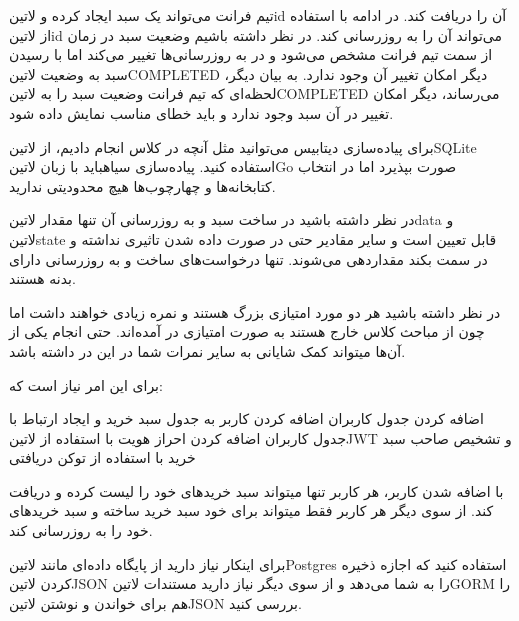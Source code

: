 
تیم فرانت می‌تواند یک سبد ایجاد کرده و ‌لاتین{id} آن را دریافت کند.
در ادامه با استفاده از ‌لاتین{id} می‌تواند آن را به روزرسانی کند.
در نظر داشته باشیم وضعیت سبد در زمان از سمت تیم فرانت مشخص می‌شود و در به روزرسانی‌ها تغییر می‌کند اما با رسیدن سبد به وضعیت ‌لاتین{COMPLETED} دیگر امکان تغییر آن وجود ندارد.
به بیان دیگر، لحظه‌ای که تیم فرانت وضعیت سبد را به ‌لاتین{COMPLETED} می‌رساند، دیگر امکان تغییر در آن سبد وجود ندارد و باید خطای مناسب نمایش داده شود.

برای پیاده‌سازی دیتابیس می‌توانید مثل آنچه در کلاس انجام دادیم، از ‌لاتین{SQLite} استفاده کنید.
پیاده‌سازی ‌سیاه{باید} با زبان ‌لاتین{Go} صورت بپذیرد اما در انتخاب کتابخانه‌ها و چهارچوب‌ها هیچ محدودیتی ندارید.

در نظر داشته باشید در ساخت سبد و به روزرسانی آن تنها مقدار ‌لاتین{data} و ‌لاتین{state} قابل تعیین است و سایر مقادیر حتی در صورت داده شدن
تاثیری نداشته و در سمت بکند مقداردهی می‌شوند. تنها درخواست‌های ساخت و به روزرسانی دارای بدنه هستند.


در نظر داشته باشید هر دو مورد امتیازی بزرگ هستند و نمره زیادی خواهند داشت اما چون از مباحث کلاس خارج هستند به صورت امتیازی در آمده‌اند.
حتی انجام یکی از آن‌ها میتواند کمک شایانی به سایر نمرات شما در این در داشته باشد.


برای این امر نیاز است که:

 اضافه کردن جدول کاربران
 اضافه کردن کاربر به جدول سبد خرید و ایجاد ارتباط با جدول کاربران
 اضافه کردن احراز هویت با استفاده از ‌لاتین{JWT} و تشخیص صاحب سبد خرید با استفاده از توکن دریافتی

با اضافه شدن کاربر، هر کاربر تنها میتواند سبد خریدهای خود را لیست کرده و دریافت کند.
از سوی دیگر هر کاربر فقط میتواند برای خود سبد خرید ساخته و سبد خریدهای خود را به روزرسانی کند.


برای اینکار نیاز دارید از پایگاه داده‌ای مانند ‌لاتین{Postgres} استفاده کنید
که اجازه ذخیره کردن ‌لاتین{JSON} را به شما می‌دهد و از سوی دیگر نیاز دارید
مستندات ‌لاتین{GORM} را هم برای خواندن و نوشتن ‌لاتین{JSON} بررسی کنید.
